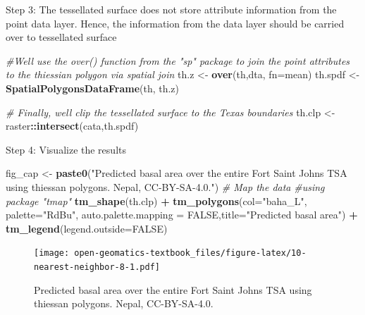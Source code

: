 \documentclass[
]{book}
\newenvironment{Shaded}{\begin{snugshade}}{\end{snugshade}}
\newcommand{\AttributeTok}[1]{\textcolor[rgb]{0.13,0.29,0.53}{#1}}
\newcommand{\CommentTok}[1]{\textcolor[rgb]{0.56,0.35,0.01}{\textit{#1}}}
\newcommand{\ConstantTok}[1]{\textcolor[rgb]{0.56,0.35,0.01}{#1}}
\newcommand{\FunctionTok}[1]{\textcolor[rgb]{0.13,0.29,0.53}{\textbf{#1}}}
\newcommand{\NormalTok}[1]{#1}
\newcommand{\OtherTok}[1]{\textcolor[rgb]{0.56,0.35,0.01}{#1}}
\newcommand{\SpecialCharTok}[1]{\textcolor[rgb]{0.81,0.36,0.00}{\textbf{#1}}}
\newcommand{\StringTok}[1]{\textcolor[rgb]{0.31,0.60,0.02}{#1}}
\begin{document}
Step 3: The tessellated surface does not store attribute information from the point data layer. Hence, the information from the data layer should be carried over to tessellated surface

\begin{Shaded}
\begin{Highlighting}[]
\CommentTok{\#We\textquotesingle{}ll use the over() function from the "sp" package to join the point attributes to the thiessian polygon via spatial join}
\NormalTok{th.z     }\OtherTok{\textless{}{-}} \FunctionTok{over}\NormalTok{(th,dta, }\AttributeTok{fn=}\NormalTok{mean)}
\NormalTok{th.spdf  }\OtherTok{\textless{}{-}}  \FunctionTok{SpatialPolygonsDataFrame}\NormalTok{(th, th.z)}

\CommentTok{\# Finally, we\textquotesingle{}ll clip the tessellated  surface to the Texas boundaries}
\NormalTok{th.clp   }\OtherTok{\textless{}{-}}\NormalTok{ raster}\SpecialCharTok{::}\FunctionTok{intersect}\NormalTok{(cata,th.spdf)}
\end{Highlighting}
\end{Shaded}

Step 4: Visualize the results

\begin{Shaded}
\begin{Highlighting}[]
\NormalTok{fig\_cap }\OtherTok{\textless{}{-}} \FunctionTok{paste0}\NormalTok{(}\StringTok{"Predicted basal area over the entire Fort Saint Johns TSA using thiessan polygons. Nepal, CC{-}BY{-}SA{-}4.0."}\NormalTok{)}
\CommentTok{\# Map the data}
\CommentTok{\#using package "tmap"}
\FunctionTok{tm\_shape}\NormalTok{(th.clp) }\SpecialCharTok{+}
  \FunctionTok{tm\_polygons}\NormalTok{(}\AttributeTok{col=}\StringTok{"baha\_L"}\NormalTok{, }\AttributeTok{palette=}\StringTok{"RdBu"}\NormalTok{, }\AttributeTok{auto.palette.mapping =} \ConstantTok{FALSE}\NormalTok{,}\AttributeTok{title=}\StringTok{"Predicted basal area"}\NormalTok{) }\SpecialCharTok{+}
  \FunctionTok{tm\_legend}\NormalTok{(}\AttributeTok{legend.outside=}\ConstantTok{FALSE}\NormalTok{)}
\end{Highlighting}
\end{Shaded}

\begin{figure}
\centering
\texttt{[image: open-geomatics-textbook\_files/figure-latex/10-nearest-neighbor-8-1.pdf]}
\caption{\label{fig:10-nearest-neighbor-8}Predicted basal area over the entire Fort Saint Johns TSA using thiessan polygons. Nepal, CC-BY-SA-4.0.}
\end{figure}
\end{document}
